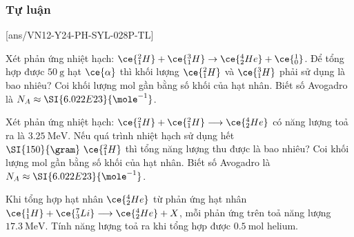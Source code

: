 \subsubsection{Tự luận}
[ans/VN12-Y24-PH-SYL-028P-TL]
\setcounter{ex}{0}
\begin{ex}
	Xét phản ứng nhiệt hạch: $\ce{_1^2H}+\ce{_1^3H} \rightarrow \ce{_2^4He}+ \ce{_0^1}$. Để tổng hợp được $\SI{50}{\gram}$ hạt $\ce{\alpha}$ thì khối lượng $\ce{_1^2H}$ và $\ce{_1^3H}$ phải sử dụng là bao nhiêu? Coi khối lượng mol gần bằng số khối của hạt nhân. Biết số Avogadro là $N_{A} \approx \SI{6.022E23}{\mole^{-1}}$.
\end{ex}
\begin{ex}
	Xét phản ứng nhiệt hạch: $\ce{_1^2H}+\ce{_1^2H} \longrightarrow \ce{_2^4He}$ có năng lượng toả ra là $\SI{3.25}{\mega\electronvolt}$. Nếu quá trình nhiệt hạch sử dụng  hết $\SI{150}{\gram}\ \ce{_1^2H}$ thì tổng năng lượng thu được là bao nhiêu? Coi khối lượng mol gần bằng số khối của hạt nhân. Biết số Avogadro là $N_{A} \approx \SI{6.022E23}{\mole^{-1}}$.
\end{ex}
\begin{ex}
	Khi tổng hợp hạt nhân $\ce{_2^4He}$ từ phản ứng hạt nhân $\ce{_1^1H}+\ce{_3^7Li} \longrightarrow\ce{_2^4He}+X$, mỗi phản ứng trên toả năng lượng $\SI{17.3}{\mega\electronvolt}$. Tính năng lượng toả ra khi tổng hợp được $\SI{0.5}{\mole}$ helium.
\end{ex}
